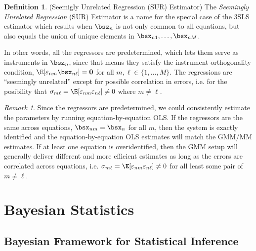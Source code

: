 \documentclass[12pt]{article}
\theoremstyle{plain}
\theoremstyle{definition}
\newtheorem{defn}[thm]{Definition}
\theoremstyle{remark}
\newtheorem*{rmk}{Remark}
\renewcommand{\bso}{\boldsymbol{0}}
\begin{document}
\begin{defn}(Seemigly Unrelated Regression (SUR) Estimator)
The \emph{Seemingly Unrelated Regression} (SUR) Estimator is a name for
the special case of the 3SLS estimator which results when $\bsz_n$ is
not only common to all equations, but also equals the union of unique
elements in $\bsx_{n1},\ldots,\bsx_{nM}$.

In other words, all the regressors are predetermined, which lets them
serve as instruments in $\bsz_n$, since that means they satisfy the
instrument orthogonality condition,
$\E[\varepsilon_{nm}\bsx_{n\ell}]=\bso$ for all
$m,\ell\in\{1,\ldots,M\}$.
The regressions are
``seemingly unrelated'' except for possible correlation in errors, i.e.
for the posibility that
$\sigma_{m\ell}=\E[\varepsilon_{nm}\varepsilon_{n\ell}]\neq0$ where
$m\neq\ell$.
\end{defn}

\begin{rmk}
Since the regressors are predetermined, we could consistently estimate
the parameters by running equation-by-equation OLS. If the regressors
are the same across equations, $\bsx_{nm}=\bsx_n$ for all $m$, then the
system is exactly identified and the equation-by-equation OLS estimates
will match the GMM/MM estimates. If at least one equation is
overidentified, then the GMM setup will generally deliver different and
more efficient estimates as long as the errors are correlated across
equations, i.e.
$\sigma_{m\ell}=\E[\varepsilon_{nm}\varepsilon_{n\ell}]\neq 0$ for all
least some pair of $m\neq\ell$.
\end{rmk}


\clearpage
\section{Bayesian Statistics}
\label{sec:bayesian}

\subsection{Bayesian Framework for Statistical Inference}
\end{document}
